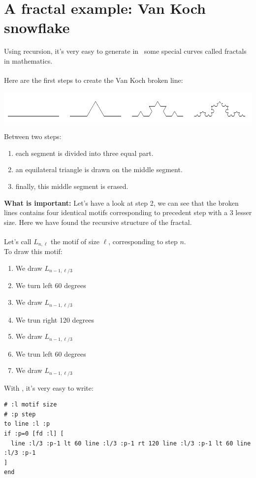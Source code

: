 \section{A fractal example: Van Koch snowflake} \label{vankoch}
\noindent Using recursion, it's very easy to generate in \logo\ some special curves called fractals in mathematics. \\ \\
Here are the first steps to create the Van Koch broken line: 
\begin{center}
\includegraphics[width=\textwidth]{pics/koch0123.png}
\end{center}
Between two steps:
\begin{enumerate}
 \item each segment is divided into three equal part.
 \item an equilateral triangle is drawn on the middle segment.
 \item finally, this middle segment is erased.
\end{enumerate}
\textbf{What is important:}  Let's have a look at step 2, we  can see that the broken lines contains four identical motifs corresponding to precedent step with a 3 lesser size. Here we have found the recursive structure of the fractal.\\ \\
Let's call $L_{n,\ell}$ the motif of size $\ell$, corresponding to step $n$.\\
To draw this motif:
\begin{enumerate}
 \item We draw $L_{n-1,\ell/3}$
 \item We turn left 60 degrees
 \item We draw $L_{n-1,\ell/3}$
 \item We trun right 120 degrees
 \item We draw $L_{n-1,\ell/3}$
 \item We trun left 60 degrees
 \item We draw  $L_{n-1,\ell/3}$
\end{enumerate}
With \logo, it's very easy to write:
\begin{verbatim}
# :l motif size
# :p step
to line :l :p
if :p=0 [fd :l] [
  line :l/3 :p-1 lt 60 line :l/3 :p-1 rt 120 line :l/3 :p-1 lt 60 line :l/3 :p-1
]
end
\end{verbatim}
